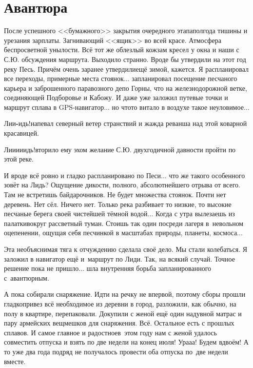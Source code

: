 \chapter{Авантюра} 
\vepsianrose

После успешного <<бумажного>> закрытия очередного этапа\mdash полгода тишины и урезания зарплаты. Загнивающий <<ящик>> во всей красе. Атмосфера беспросветной унылости. Всё тот же облезлый кожзам кресел у окна и наши с С.Ю. обсуждения маршрута. Выходило странно. Вроде бы утвердили на этот год реку Песь. Причём очень заранее утвердили\mdash ещё зимой, кажется. Я распланировал все переходы, примерные места стоянок$\ldots$ запланировал посещение песчаного карьера и заброшенного паравозного депо Горны, что на железнодорожной ветке, соединяющей Подборовье и Кабожу. И даже уже заложил путевые точки и маршрут сплава в GPS-навигатор$\ldots$ но что\sdash то витало в воздухе такое неуловимое$\ldots$
 
\diagdash Ли\sdash и\textbf{-}идь!\mdash напевал северный ветер странствий и жажда реванша над этой коварной красавицей.

\diagdash Ли\sdash и\sdash и\sdash и\sdash идь!\mdash вторило ему эхом желание С.Ю. двухгодичной давности пройти по этой реке. 

И вроде всё ровно и гладко распланировано по Песи$\ldots$ что же такого особенного зовёт на Лидь? Ощущение дикости, полного, абсолютнейшего отрыва от всего. Там не встретишь байдарочников. Не будет множества стоянок. Почти нет деревень. Нет сёл. Ничего нет. Только река разбивает то низкие, то высокие песчаные берега своей чистейшей тёмной водой$\ldots$ Когда с утра вылезаешь из палатки\mdash вокруг рассветный туман. Стоишь так один посреди лагеря в~невольном оцепенении, ощущая себя песчинкой в масштабах природы, планеты, космоса$\ldots$

Эта необъяснимая тяга к отчуждению сделала своё дело. Мы стали колебаться. Я заложил в навигатор ещё и~маршрут по Лиди. Так, на всякий случай. Точное решение пока не пришло$\ldots$ шла внутренняя борьба запланированного с~авантюрным.

А пока собирали снаряжение. Идти на речку не впервой, поэтому сборы прошли гладко\mdash привез всё необходимое из деревни в город, разложили, как обычно, на полу в квартире, перепаковали. Докупили с женой ещё один надувной матрас и пару армейских вещмешков для снаряжения. Всё. Остальное есть с прошлых сплавов. И самое главное и радостное\mdash в~этом году нам с женой удалось совместить отпуска и взять по две недели на конец июля! Ура\sdash а\sdash а! Будем вдвоём! А то уже два года подряд не получалось провести оба отпуска по~две недели вместе.

